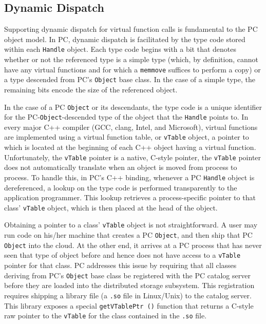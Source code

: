 \subsection{Dynamic Dispatch}
\label{sec:dyn_dis}

Supporting dynamic dispatch for virtual function calls is fundamental to the PC object model.
In PC, dynamic dispatch is facilitated by the type code stored within each
\texttt{Handle} object.
Each type code begins with a bit that denotes whether or not the referenced type is a simple type (which, by definition, cannot have any
virtual functions and for which a \texttt{memmove} suffices to perform a copy) or a type descended from PC's \texttt{Object} base class.
In the case of a simple type, the remaining bits encode the size of the referenced object.  

In the case of a PC \texttt{Object} or its descendants, the
type code is a unique identifier for the PC-\texttt{Object}-descended type of the object that the \texttt{Handle} points to.
In every major C++ compiler (GCC, clang, Intel, and Microsoft), virtual functions
are implemented using a virtual function table, or \texttt{vTable} object, a pointer to which is located at the beginning
of each C++ object having a virtual function.  Unfortunately, the \texttt{vTable} pointer is a native, C-style pointer, the
\texttt{vTable} pointer does not automatically translate when an
object is moved from process to process.  To handle this, in
PC's C++ binding, whenever a PC \texttt{Handle} object is dereferenced, 
a lookup on the
type code is performed transparently to the application programmer.  This lookup retrieves a process-specific pointer to that class' \texttt{vTable} object, which is
then placed at the head of the object.

Obtaining a pointer to a class' \texttt{vTable} object is not straightforward.
A user may run code on his/her machine that creates
a PC \texttt{Object}, and then ship that PC \texttt{Object} into the cloud.  At the other end, it arrives at a PC process that has never seen that type of object before and hence
does not have access to a \texttt{vTable} pointer for that class.
PC addresses this issue by requiring that all classes deriving from PC's \texttt{Object} base class be registered with the PC catalog
server before they are loaded into the distributed storage subsystem.  This registration requires shipping a library file (a \texttt{.so} file in Linux/Unix) to
the catalog server.  This library exposes a special
\texttt{getVTablePtr ()} function that returns a C-style raw pointer to the \texttt{vTable} for the class contained
in the \texttt{.so} file.

